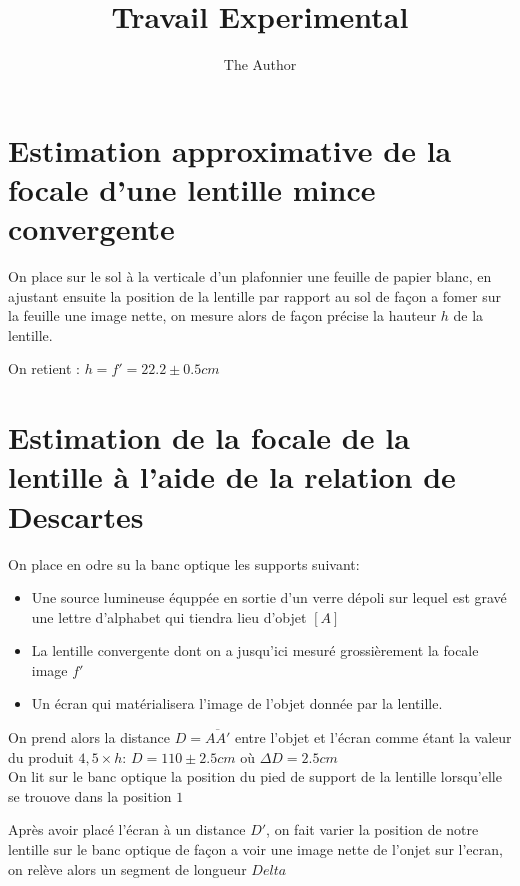 \documentclass{article}
\title{Travail Experimental}
\author{The Author}
\begin{document}
\maketitle
\section{Estimation approximative de la focale d'une lentille mince convergente}
On place sur le sol à la verticale d'un plafonnier une feuille de papier blanc, en ajustant ensuite la position de la lentille par rapport au sol de façon a fomer sur la feuille une image nette, on mesure alors de façon précise la hauteur $h$ de la lentille.

On retient : $h=f'=22.2 \pm 0.5 cm$
\section{Estimation de la focale de la lentille à l'aide de la relation de Descartes}
On place en odre su la banc optique les supports suivant:
\begin{itemize}
	\item Une source lumineuse équppée en sortie d'un verre dépoli sur lequel est gravé une lettre d'alphabet qui tiendra lieu d'objet $[A]$
	\item La lentille convergente dont on a jusqu'ici mesuré grossièrement la focale image $f'$
	\item Un écran qui matérialisera l'image de l'objet donnée par la lentille.
\end{itemize}

On prend alors la distance $D=\overline{AA'}$ entre l'objet et l'écran comme étant la valeur du produit $4,5\times h$: $D=110 \pm 2.5cm$ où $\Delta D=2.5cm$\\

On lit sur le banc optique la position du pied de support de la lentille lorsqu'elle se trouove dans la position $1$

Après avoir placé l'écran à un distance $D'$, on fait varier la position de notre lentille sur le banc optique de façon a voir une image nette de l'onjet sur l'ecran, on relève alors un segment
de longueur $Delta$
\end{document}
